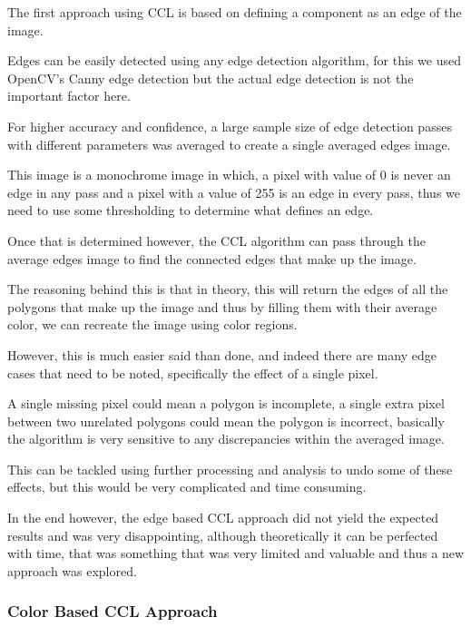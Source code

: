 \documentclass[12pt]{article}
\newcommand{\sentence}{} %
\begin{document}
    \tab
    The first approach using CCL is based on defining a component as an edge of the image.
    \sentence
    Edges can be easily detected using any edge detection algorithm, for this we used OpenCV's Canny edge detection
    but the actual edge detection is not the important factor here.
    \sentence
    For higher accuracy and confidence, a large sample size of edge detection passes with different parameters was
    averaged to create a single averaged edges image.
    \sentence
    This image is a monochrome image in which, a pixel with value of 0 is never an edge in any pass and a pixel with
    a value of 255 is an edge in every pass, thus we need to use some thresholding to determine what defines an edge.
    \sentence
    Once that is determined however, the CCL algorithm can pass through the average edges image to find the connected
    edges that make up the image.
    \sentence
    The reasoning behind this is that in theory, this will return the edges of all the polygons that make up the
    image and thus by filling them with their average color, we can recreate the image using color regions.
    \sentence
    However, this is much easier said than done, and indeed there are many edge cases that need to be noted,
    specifically the effect of a single pixel.
    \sentence
    A single missing pixel could mean a polygon is incomplete, a single extra pixel between two unrelated polygons
    could mean the polygon is incorrect, basically the algorithm is very sensitive to any discrepancies within the
    averaged image.
    \sentence
    This can be tackled using further processing and analysis to undo some of these effects, but this would be very
    complicated and time consuming.
    \sentence
    In the end however, the edge based CCL approach did not yield the expected results and was very disappointing,
    although theoretically it can be perfected with time, that was something that was very limited and valuable and
    thus a new approach was explored.

    \subsubsection{Color Based CCL Approach}\label{subsubsec:color-based-ccl-approach}


\end{document}

